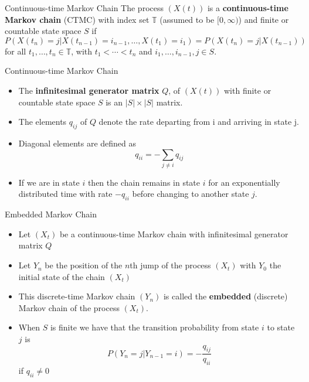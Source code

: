 \documentclass{beamer}
\theoremstyle{definition}
\begin{document}

\begin{frame}{Continuous-time Markov Chain}
The process $(X(t))$ is a \textbf{continuous-time Markov chain} (CTMC) with index set $\mathbb T$ (assumed to be $[0, \infty)$) and finite or countable state space $S$ if
$$
P(X(t_n) = j | X(t_{n - 1}) = i_{n-1}, \ldots, X(t_1) = i_{1}) = P(X(t_n) = j | X(t_{n - 1}))%
$$
for all $t_1, \ldots, t_n \in \mathbb T$, with $t_1 < \cdots < t_n$ and $i_1,\ldots, i_{n - 1}, j \in S$.
\end{frame}

\begin{frame}{Continuous-time Markov Chain}

\begin{itemize}
    \item The \textbf{infinitesimal generator matrix} $Q$, of $(X(t))$ with finite or countable state space $S$ is an $|S| \times |S|$ matrix.
    \item The elements $q_{ij}$ of $Q$ denote the rate departing from i and arriving in state j.
    \item Diagonal elements are defined as
    $$
    q_{ii} = - \sum_{j \not = i} q_{ij}
    $$
    \item If we are in state $i$ then the chain remains in state $i$ for an exponentially distributed time with rate $-q_{ii}$ before changing to another state $j$.
\end{itemize}


\end{frame}

\begin{frame}{Embedded Markov Chain}
\begin{itemize}
    \item Let $(X_t)$ be a continuous-time Markov chain with infinitesimal generator matrix $Q$
    \item Let $Y_n$ be the position of the $n$th jump of the process $(X_t)$ with $Y_0$ the initial state of the chain $(X_t)$
    \item This discrete-time Markov chain $(Y_n)$ is called the \textbf{embedded} (discrete) Markov chain of the process $(X_t)$.
    \item When $S$ is finite we have that the transition probability from state $i$ to state $j$ is
    $$
    P(Y_{n} = j | Y_{n - 1} = i) = -\frac{q_{ij}}{q_{ii}}
    $$
    if $q_{ii} \not = 0$
\end{itemize}
\end{frame}
\end{document}
